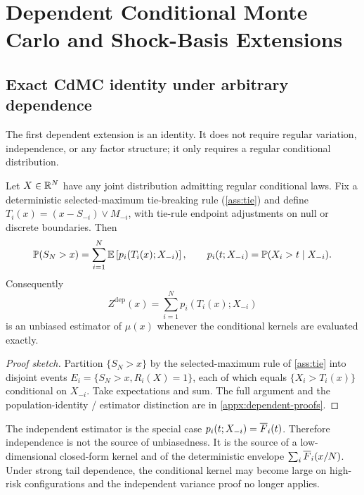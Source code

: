 \section{Dependent Conditional Monte Carlo and Shock-Basis Extensions}
\label{sec:dependent-cdmcs}

\subsection{Exact CdMC identity under arbitrary dependence}

The first dependent extension is an identity. It does not require regular
variation, independence, or any factor structure; it only requires a regular
conditional distribution.

\begin{theorem}
\label{thm:dep-cdmc-unbiased}
Let \(X\in\mathbb{R}^N\) have any joint distribution admitting regular conditional
laws. Fix a deterministic selected-maximum tie-breaking rule (\cref{ass:tie})
and define \(T_i(x)=(x-S_{-i})\vee M_{-i}\), with tie-rule endpoint
adjustments on null or discrete boundaries. Then
\[
  \mathbb{P}(S_N>x)
  =\sum_{i=1}^N
    \mathbb{E}\left[p_i(T_i(x);X_{-i})\right],
  \qquad
  p_i(t;X_{-i})=\mathbb{P}(X_i>t\mid X_{-i}).
\]
Consequently
\[
  Z^{\mathrm{dep}}(x)=\sum_{i=1}^N p_i(T_i(x);X_{-i})
\]
is an unbiased estimator of \(\mu(x)\) whenever the conditional kernels are
evaluated exactly.
\end{theorem}

\begin{proof}[Proof sketch]
Partition $\{S_N>x\}$ by the selected-maximum rule of \cref{ass:tie} into
disjoint events $E_i=\{S_N>x,R_i(X)=1\}$, each of which equals
$\{X_i>T_i(x)\}$ conditional on $X_{-i}$. Take expectations and sum. The full
argument and the population-identity / estimator distinction are in
\cref{appx:dependent-proofs}.
\end{proof}

\begin{remark}
The independent estimator is the special case
\(p_i(t;X_{-i})=\overline{F}_i(t)\). Therefore independence is not the source of
unbiasedness. It is the source of a low-dimensional closed-form kernel and of
the deterministic envelope \(\sum_i\overline{F}_i(x/N)\). Under strong tail dependence,
the conditional kernel may become large on high-risk configurations and the
independent variance proof no longer applies.
\end{remark}

